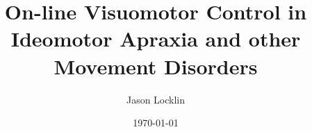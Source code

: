 \documentclass[letter,12pt,titlepage]{article}
\author{Jason Locklin}
\title{On-line Visuomotor Control in Ideomotor Apraxia and other Movement Disorders}
\date{\today}
\begin{document}
\maketitle
\doublespacing %

 


\end{document}
